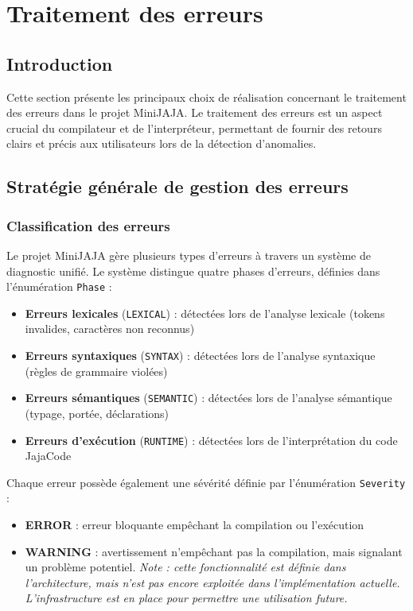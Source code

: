 \section{Traitement des erreurs}\label{sec:traitement-des-erreurs}

\subsection{Introduction}\label{subsec:introduction}
Cette section présente les principaux choix de réalisation concernant le traitement des erreurs dans le projet MiniJAJA. Le traitement des erreurs est un aspect crucial du compilateur et de l'interpréteur, permettant de fournir des retours clairs et précis aux utilisateurs lors de la détection d'anomalies.

\subsection{Stratégie générale de gestion des erreurs}\label{subsec:strategie-generale-de-gestion-des-erreurs}

\subsubsection{Classification des erreurs}
Le projet MiniJAJA gère plusieurs types d'erreurs à travers un système de diagnostic unifié.
Le système distingue quatre phases d'erreurs, définies dans l'énumération \texttt{Phase} :
\begin{itemize}
    \item \textbf{Erreurs lexicales} (\texttt{LEXICAL}) : détectées lors de l'analyse lexicale (tokens invalides, caractères non reconnus)
    \item \textbf{Erreurs syntaxiques} (\texttt{SYNTAX}) : détectées lors de l'analyse syntaxique (règles de grammaire violées)
    \item \textbf{Erreurs sémantiques} (\texttt{SEMANTIC}) : détectées lors de l'analyse sémantique (typage, portée, déclarations)
    \item \textbf{Erreurs d'exécution} (\texttt{RUNTIME}) : détectées lors de l'interprétation du code JajaCode
\end{itemize}

Chaque erreur possède également une sévérité définie par l'énumération \texttt{Severity} :
\begin{itemize}
    \item \textbf{ERROR} : erreur bloquante empêchant la compilation ou l'exécution
    \item \textbf{WARNING} : avertissement n'empêchant pas la compilation, mais signalant un problème potentiel.
    \textit{Note : cette fonctionnalité est définie dans l'architecture, mais n'est pas encore exploitée dans l'implémentation actuelle. L'infrastructure est en place pour permettre une utilisation future.}
\end{itemize}

